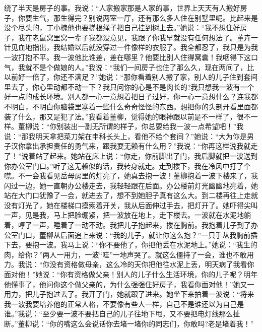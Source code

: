 \documentclass[12pt,oneside]{book}
\begin{document}
绕了半天是房子的事。我说：``人家搬家那是人家的事，世界上天天有人搬好房子，你要生气，那生得完？别说两室一厅，还有那么多人住在别墅里呢。比起来是没个尽头的，丁小槐他也要搓根绳子把自己挂到树上去。''她说：``我不想住好房子，我在老鼠窝里窝一辈子我都没意见，我跟了你我早就没有任何想法了。董卉一针见血地指出，我结婚以后就没穿过一件像样的衣服了。我全都忍了，我只是为我一波打抱不平。我一波他比谁差，差在哪里？他要比别人住得窝囊！我咽得下这口气，我就不是个做娘的人。''我说：``我们一间房子也住了那么久，现在两间了，比以前好一倍了，你还不满足？''她说：``那你看着别人搬了家，别人的儿子住到套间里去了，你心里动都不动一下？我只问你的心是不是肉长的?我只想我一波有一个好一点的成长环境。别人都一心一意想着把日子过好，你一心一意想什么？连我都不明白，不明白你脑袋里塞着一些什么奇奇怪怪的东西。想把你的头剖开看里面都装了什么，那又是犯了法。''我看着董柳，觉得她的眼神跟以前是不一样了，很不一样。董柳说：``你别装出一副无所谓的样子，你总要给我一波一点希望吧！''我说：``那我明天拿把菜刀架在申科长头上，看他不给个套间？''她说：``大为你是男子汉你拿出承担责任的勇气来，跟我耍无赖有什么用？''我说：``你再这样说我就走了！''说着站了起来。她站在床上说：``你走，你前脚出了门，我后脚就把一波送到你办公室门口。''听了这无赖似的话，我转身就走。走到楼下，我在冷风中打了个噤。不一会我看见岳母房里的灯亮了，她真去抱一波！董柳抱着一波下楼来了，我闪过一边，她一直朝办公楼走去，我轻轻跟在后面。办公楼前灯光幽幽地亮着，她站在大门口犹豫了一会，就进去了，想不到她胆子真有这么大。到二楼再往上走就没有灯光了，她在楼梯口摸索着开关，我从后面伸过手去，把灯开了。她吓得尖叫一声，见是我，马上把脸绷紧，把一波放在地上，走下楼去。一波就在水泥地躺着，哼了一声，睡着了一动不动。我把儿子抱起来，搂在胸前。我抱着儿子到了办公室门口，董柳从后面追上来说：``我的儿子，就让你这么抱？''一只手从我胸前插下去，要抱一波。我马上说：``你不要他了，你把他丢在水泥地上。''她说：``我生的肉，给你？''两人一用力，一波``哇''一地声哭了。就这么僵持了一会，谁也不敢用力。我说：``你没有资格做母亲，这么冷的天你把他往水泥上丢，明天病了我看你面对他！''她说：``你有资格做父亲！别人的儿子什么生活环境，你的儿子呢？明年他懂事了，他问你这个做父亲的，为什么强强住好房子，我看你面对他！''她又一用力，把儿子抱过去了。我开了门，她就跟了进来。她坐下来拍着一波说：``将来我一波我要培养他的正常人格，不要像有些人一样，自己不是谁还以为自己是谁。''我说：``至少要一波不要把自己的儿子往地下甩，又不要把电灯线那么扯断。''董柳说：``你的嘴这么会说话你去堵一堵你的同志们，你敢吗?老是堵着我！''
\end{document}
